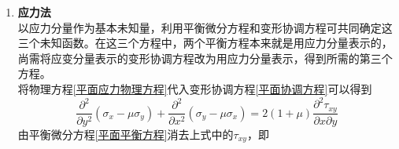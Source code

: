 \documentclass[10pt,a4]{article}
\numberwithin{equation}{section}
\begin{document}
\begin{enumerate}[\textbf{方法} 1 ]
		\item \textbf{应力法}\\
		\hspace*{1.75em} 以应力分量作为基本未知量，利用平衡微分方程和变形协调方程可共同确定这三个未知函数。在这三个方程中，两个平衡方程本来就是用应力分量表示的，尚需将应变分量表示的变形协调方程改为用应力分量表示，得到所需的第三个方程。 \\
		\hspace*{1.75em} 将物理方程\eqref{平面应力物理方程}代入变形协调方程\eqref{平面协调方程}可以得到
		\begin{equation}
			\dfrac{\partial^2}{\partial y^2} (\sigma_x - \mu \sigma_y) + \dfrac{\partial^2}{\partial x^2}(\sigma_y - \mu \sigma_x) = 2(1+\mu) \dfrac{\partial^2 \tau_{xy}}{\partial x \partial y}
		\end{equation}
		由平衡微分方程\eqref{平面平衡方程}消去上式中的$\tau_{xy}$，即
		
	\end{enumerate}
	
	\clearpage
	\color{titlepurplec}
	\appendix
	\printindex
\end{document}
